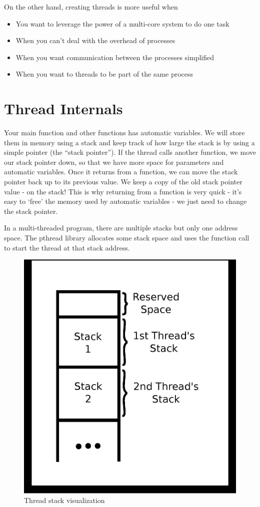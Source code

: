 On the other hand, creating threads is more useful when
\begin{itemize}
\item You want to leverage the power of a multi-core system to do one task
\item When you can't deal with the overhead of processes
\item When you want communication between the processes simplified
\item When you want to threads to be part of the same process
\end{itemize}

\section{Thread Internals}

Your main function and other functions has automatic variables.
We will store them in memory using a stack and keep track of how large the stack is by using a simple pointer (the ``stack pointer'').
If the thread calls another function, we move our stack pointer down, so that we have more space for parameters and automatic variables.
Once it returns from a function, we can move the stack pointer back up to its previous value.
We keep a copy of the old stack pointer value - on the stack!
This is why returning from a function is very quick - it's easy to `free' the memory used by automatic variables - we just need to change the stack pointer.

In a multi-threaded program, there are multiple stacks but only one address space. The pthread library allocates some stack space and uses the  function call to start the thread at that stack address.

\begin{figure}[H]
\centering
\includegraphics[width=.5\textwidth]{threads/drawings/thread_stack.eps}
\caption{Thread stack visualization}
\end{figure}


